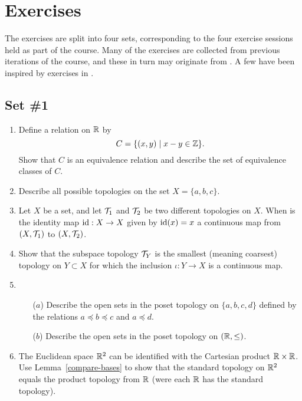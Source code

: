 \section{Exercises}
The exercises are split into four sets, corresponding to the four exercise sessions held as part of the course. Many of the exercises are collected from previous iterations of the course, and these in turn may originate from \cite{Mun}. A few have been inspired by exercises in \cite{DM}.

\subsection{Set \#1}

\begin{enumerate}
  \item Define a relation on $\mathbb{R}$ by
    \[
      C=\{(x,y) \mid x - y \in \mathbb{Z} \}.
    \]
    Show that $C$ is an equivalence relation and describe the set of equivalence classes of $C$.
  \item Describe all possible topologies on the set $X = \{a,b,c\}$.
  \item Let $X$ be a set, and let $\mathcal{T}_1$ and $\mathcal{T}_2$ be two different topologies on $X$. When is the identity map $\mathrm{id} : X \to X$ given by $\mathrm{id}(x) = x$ a continuous map from $(X,\mathcal{T}_1)$ to $(X,\mathcal{T}_2)$.
  \item
		Show that the subspace topology $\mathcal{T}_Y$ is the smallest (meaning coarsest) topology on $Y\subset X$ for which the inclusion $\iota:Y \rightarrow X$ is a continuous map.
	
  \item \begin{itemize}
		\item[($a$)] Describe the open sets in the poset topology on $\{a,b,c,d\}$ defined by the relations $a\preceq b\preceq c$ and $a\preceq d$.
		\item[($b$)] Describe the open sets in the poset topology on $(\mathbb{R},\leq)$.
	\end{itemize}
	
  \item The Euclidean space $\mathbb{R}^2$ can be identified with the Cartesian product $\mathbb{R} \times \mathbb{R}$. Use Lemma~\ref{compare-bases} to show that the standard topology on $\mathbb{R}^2$ equals the product topology from $\mathbb{R}$ (were each $\mathbb{R}$ has the standard topology).
  

\end{enumerate}
